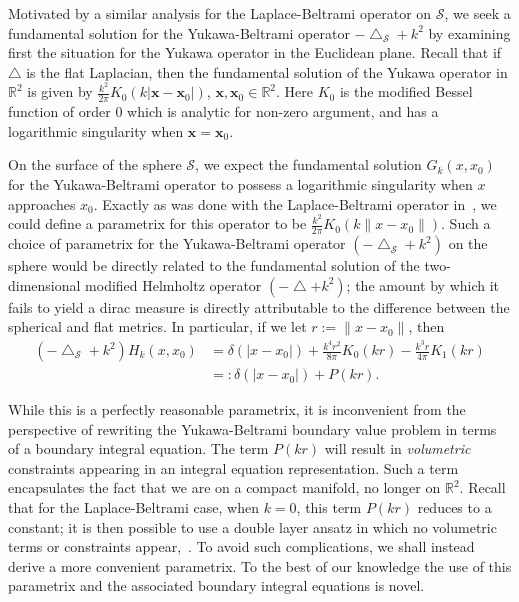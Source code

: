 \documentclass[final]{siamltex}
\newcommand{\lap}{\bigtriangleup}
\renewcommand{\S} {\mathcal{S}}
\begin{document}
Motivated by a similar analysis for the Laplace-Beltrami operator on
$\S$, we seek a fundamental solution for the Yukawa-Beltrami operator
$-\lap_\S + k^2$ by examining first the situation for the Yukawa
operator in the Euclidean plane. Recall that if $\lap$ is the flat
Laplacian, then the fundamental solution of the Yukawa operator in
$\mathbb{R}^2$ is given by $\frac{k^2}{2\pi}
K_{0}(k|\mathbf{x}-\mathbf{x}_{0}|)$, $\mathbf{x},\mathbf{x}_{0} \in
\mathbb{R}^{2}$. Here $K_{0}$ is the modified Bessel function of order 0
which is analytic for non-zero argument, and has a logarithmic
singularity when $\mathbf{x}=\mathbf{x}_{0}$. 

On the surface of the sphere $\S$, we expect the fundamental solution
$G_k(x,x_{0})$ for the Yukawa-Beltrami operator to possess a logarithmic
singularity when $x$ approaches $x_{0}$. Exactly as was done  with the
Laplace-Beltrami operator in~\cite{gemmrich}, we could define a
parametrix for this operator to be $\frac{k^2}{2\pi}K_0(k\|x-x_{0}\|)$.
Such a choice of parametrix for the Yukawa-Beltrami operator
$(-\lap_{\S}+k^2)$ on the sphere would be directly related to the
fundamental solution of the two-dimensional modified Helmholtz operator
$(-\lap+k^2)$; the amount by which it fails to yield a dirac measure is
directly attributable to the difference between the spherical and flat
metrics.  In particular, if we let $r:=\|x-x_{0}\|$, then
\begin{align*}
  (-\lap_{\S} + k^{2})H_{k}(x,x_{0})&=
    \delta(|x-x_{0}|) 
    +\frac{k^{4}r^{2}}{8\pi}K_{0}(kr) - \frac{k^{3}r}{4\pi}K_{1}(kr) \\
  &=: \delta(|x-x_{0}|) + P(kr).
\end{align*}

While this is a perfectly reasonable parametrix, it is inconvenient
from the perspective of rewriting the Yukawa-Beltrami boundary value
problem in terms of a boundary integral equation. The term $P(kr)$ will
result in {\it volumetric} constraints  appearing in an integral
equation representation. Such a term encapsulates the fact that we are
on a compact manifold, no longer on $\mathbb{R}^2$. Recall that for the
Laplace-Beltrami case, when $k=0$, this term $P(kr)$ reduces to a
constant; it is then possible to use a double layer ansatz in which no
volumetric terms or constraints appear,~\cite{kro:nig2013}.
To avoid such complications, we shall instead derive a more convenient parametrix. To the best of our knowledge the use of this parametrix and the associated boundary integral equations is novel. 
\end{document}
